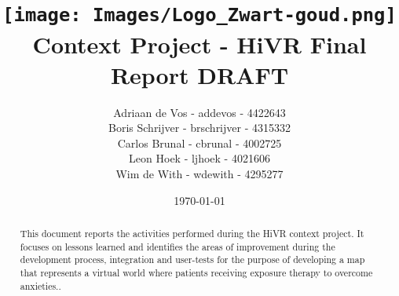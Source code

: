 \documentclass[11pt]{article}
\begin{document}
\title{	
		\vspace{-3.5cm}
		\texttt{[image: Images/Logo\_Zwart-goud.png]} 
		\newline Context Project - HiVR Final Report DRAFT
}
\author{
	Adriaan de Vos - addevos - 4422643\\
	Boris Schrijver - brschrijver - 4315332\\
	Carlos Brunal - cbrunal - 4002725\\
	Leon Hoek - ljhoek - 4021606\\
	Wim de With - wdewith - 4295277
}
\date{\today}

\maketitle
\begin{abstract}
This document reports the activities performed during the HiVR context project. It focuses on lessons learned and identifies the areas of improvement during the development process, integration and user-tests for the purpose of developing a map that represents a virtual world where patients receiving exposure therapy to overcome anxieties.\cite{virtualvsrealtrial}.
\end{abstract}

\newpage
\tableofcontents
\newpage


\end{document}
